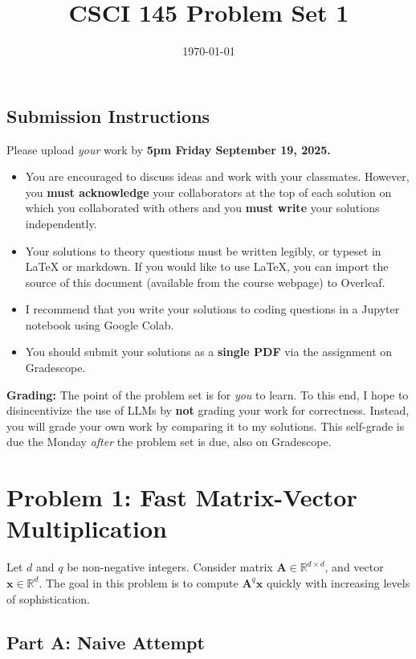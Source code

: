\documentclass{article}
\title{CSCI 145 Problem Set 1}
\author{} %
\date{\today}
\begin{document}
\maketitle

\subsection*{Submission Instructions}

Please upload \textit{your} work by
\textbf{5pm Friday September 19, 2025.}
\begin{itemize}
\item You are encouraged to discuss ideas
and work with your classmates. However, you
\textbf{must acknowledge} your collaborators
at the top of each solution on which
you collaborated with others 
and you \textbf{must write} your solutions
independently.
\item Your solutions to theory questions must
be written legibly, or typeset in LaTeX or markdown.
If you would like to use LaTeX, you can import the source of this document (available from the course webpage) to Overleaf.
\item I recommend that you write your solutions to coding questions in a Jupyter notebook using Google Colab.
\item You should submit your solutions as a \textbf{single PDF} via the assignment on Gradescope.
\end{itemize}

\noindent
\textbf{Grading:} The point of the problem set is for \textit{you} to learn. To this end, I hope to disincentivize the use of LLMs by \textbf{not} grading your work for correctness. Instead, you will grade your own work by comparing it to my solutions. This self-grade is due the Monday \textit{after} the problem set is due, also on Gradescope.

\newpage \section*{Problem 1: Fast Matrix-Vector Multiplication}

Let $d$ and $q$ be non-negative integers.
Consider matrix $\mathbf{A} \in \mathbb{R}^{d \times d}$, and vector $\mathbf{x} \in \mathbb{R}^d$.
The goal in this problem is to compute $\mathbf{A}^q \mathbf{x}$ quickly with increasing levels of sophistication.

\subsection*{Part A: Naive Attempt}
\end{document}
